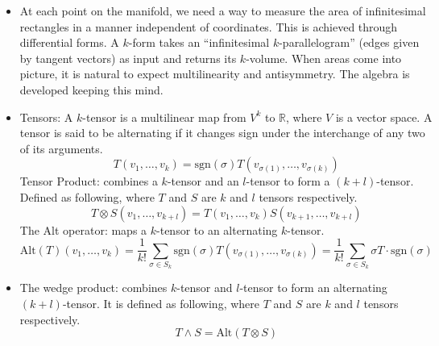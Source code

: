 \documentclass[20pt,margin=1in,innermargin=-4.5in,blockverticalspace=-0.25in]{tikzposter}
\begin{document}
\begin{columns}
{\begin{itemize}
            \item At each point on the manifold, we need a way to measure the area of infinitesimal rectangles in a manner independent of coordinates. This is achieved through differential forms. A $k$-form takes an ``infinitesimal $k$-parallelogram'' (edges given by tangent vectors) as input and returns its $k$-volume. When areas come into picture, it is natural to expect multilinearity and antisymmetry. The algebra is developed keeping this mind. 
            \item Tensors: A $k$-tensor is a multilinear map from $V^k$ to $\mathbb{R}$, where $V$ is a vector space. A tensor is said to be alternating if it changes sign under the interchange of any two of its arguments.
            \[
                T(v_1, \ldots, v_k) = \text{sgn}(\sigma) T(v_{\sigma(1)}, \ldots, v_{\sigma(k)})
            \]
            Tensor Product: combines a $k$-tensor and an $l$-tensor to form a $(k+l)$-tensor. Defined as following, where $T$ and $S$ are $k$ and $l$ tensors respectively.
            \[
                T \otimes S(v_1, \ldots, v_{k+l}) = T(v_1, \ldots, v_k) S(v_{k+1}, \ldots, v_{k+l})
            \]
            The Alt operator: maps a $k$-tensor to an alternating $k$-tensor.
            \[
                \text{Alt}(T)(v_1, \ldots, v_k) = \frac{1}{k!} \sum_{\sigma \in S_k} \text{sgn}(\sigma) T(v_{\sigma(1)}, \ldots, v_{\sigma(k)}) = \frac{1}{k!} \sum_{\sigma \in S_k} \sigma T \cdot \text{sgn}(\sigma)
            \]
            \item The wedge product: combines $k$-tensor and $l$-tensor to form an alternating $(k+l)$-tensor. It is defined as following, where $T$ and $S$ are $k$ and $l$ tensors respectively.
            \[
                T \wedge S = \text{Alt}(T \otimes S)
            \]
        \end{itemize}
        }
        


\end{columns}
\end{document}
